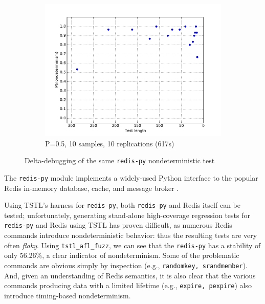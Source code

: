 \begin{figure}
\begin{subfigure}{0.67\columnwidth}
\includegraphics[width=\columnwidth]{redisforceprep}
\caption{P=0.5, 10 samples, 10 replications (617s)}
\label{fig:r3}
\end{subfigure}
\caption{Delta-debugging of the same {\tt redis-py} nondeterministic test}
\end{figure}

The {\tt redis-py} \cite{redispy} module implements a widely-used Python interface
to the popular Redis in-memory database, cache, and
message broker \cite{redis}.

Using TSTL's harness for {\tt redis-py}, both {\tt redis-py} and Redis
itself can be tested; unfortunately, generating stand-alone
high-coverage regression tests for {\tt redis-py} and Redis using TSTL
has proven difficult, as numerous Redis commands introduce nondeterministic
behavior:  thus the resulting tests are very often \emph{flaky}.   Using {\tt tstl\_afl\_fuzz}, we can see that the {\tt redis-py} has a 
stability of only 56.26\%, a clear indicator of nondeterminism. Some
of the problematic commands are obvious simply by inspection (e.g.,
{\tt randomkey, srandmember}).  And, given an understanding of Redis
semantics, it is also clear that the various
commands producing data with a limited lifetime (e.g., {\tt expire,
  pexpire}) also introduce timing-based nondeterminism.


